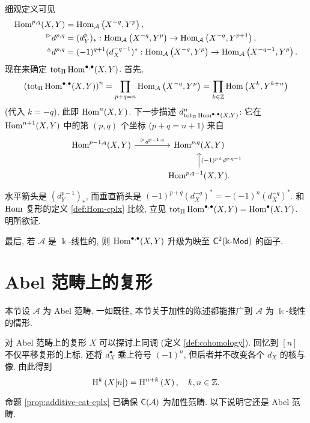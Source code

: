 \begin{example}
	细观定义可见
	\begin{equation*}\begin{aligned}
		\operatorname{Hom}^{p, q}(X, Y) & = \operatorname{Hom}_{\mathcal{A}}\left( X^{-q}, Y^p \right), \\
		{}^\vartriangleright d^{p, q} & = (d_Y^p)_* : \operatorname{Hom}_{\mathcal{A}}\left( X^{-q}, Y^p \right) \to \operatorname{Hom}_{\mathcal{A}}\left( X^{-q}, Y^{p+1} \right), \\
		{}^\vartriangle d^{p, q} & = (-1)^{q+1} (d_X^{-q-1})^* : \operatorname{Hom}_{\mathcal{A}}\left( X^{-q}, Y^p \right) \to \operatorname{Hom}_{\mathcal{A}}\left( X^{-q-1}, Y^p \right).
	\end{aligned}\end{equation*}
	现在来确定 $\operatorname{tot}_{\Pi} \operatorname{Hom}^{\bullet, \bullet}(X, Y)$. 首先,
	\[ \left(\operatorname{tot}_{\Pi} \operatorname{Hom}^{\bullet, \bullet}(X, Y)\right)^n = \prod_{p+q=n} \operatorname{Hom}_{\mathcal{A}}\left( X^{-q}, Y^p \right) = \prod_{k \in \mathbb{Z}} \operatorname{Hom}\left( X^k, Y^{k+n} \right) \]
	(代入 $k = -q$), 此即 $\operatorname{Hom}^n(X, Y)$. 下一步描述 $d_{\operatorname{tot}_{\Pi} \operatorname{Hom}^{\bullet, \bullet}(X, Y)}^n$: 它在 $\operatorname{Hom}^{n+1}(X, Y)$ 中的第 $(p, q)$ 个坐标 ($p + q = n+1$) 来自
	\[\begin{tikzcd}[column sep=large]
		\Hom^{p-1, q}(X, Y) \arrow[r, "{\dhori^{p-1, q}}"] & \Hom^{p, q}(X, Y) \\
		& \Hom^{p, q-1}(X, Y) \arrow[u, "{(-1)^p \dvert^{p, q-1}}"'] .
	\end{tikzcd}\]
	水平箭头是 $(d_Y^{p-1})_*$, 而垂直箭头是 $(-1)^{p+q} (d_X^{-q})^* = -(-1)^n (d_X^{-q})^*$. 和 $\operatorname{Hom}$ 复形的定义 \ref{def:Hom-cplx} 比较, 立见 $\operatorname{tot}_{\Pi} \operatorname{Hom}^{\bullet, \bullet}(X, Y) = \operatorname{Hom}^\bullet(X, Y)$. 明所欲证.

	最后, 若 $\mathcal{A}$ 是 $\Bbbk$-线性的, 则 $\operatorname{Hom}^{\bullet, \bullet}(X, Y)$ 升级为映至 $\mathsf{C}^2(\Bbbk\text{-}\mathsf{Mod})$ 的函子.
\end{example}

\section{Abel 范畴上的复形}\label{sec:Abel-cplx}
本节设 $\mathcal{A}$ 为 Abel 范畴. 一如既往, 本节关于加性的陈述都能推广到 $\mathcal{A}$ 为 $\Bbbk$-线性的情形.

对 Abel 范畴上的复形 $X$ 可以探讨上同调 (定义 \ref{def:cohomology}). 回忆到 $[n]$ 不仅平移复形的上标, 还将 $d_X^\bullet$ 乘上符号 $(-1)^n$, 但后者并不改变各个 $d_X$ 的核与像. 由此得到
\[ \operatorname{H}^k\left( X[n] \right) = \operatorname{H}^{n+k} \left(X \right), \quad k, n \in \mathbb{Z} . \]

命题 \ref{prop:additive-cat-cplx} 已确保 $\mathsf{C}(\mathcal{A})$ 为加性范畴. 以下说明它还是 Abel 范畴.

